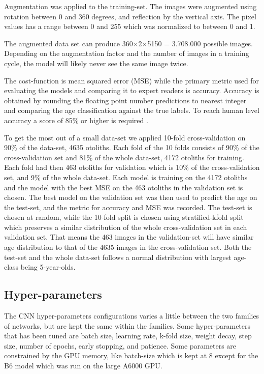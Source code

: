 \documentclass[10pt,letterpaper]{article}
\begin{document}
Augmentation was applied to the training-set. The images were augmented using rotation between 0 and 360 degrees, and reflection by the vertical axis. The pixel values has a range between 0 and 255 which was normalized to between 0 and 1.

The augmented data set can produce 360$\times$2$\times$5150 = 3.708.000 possible images.
Depending on the augmentation factor and the number of images in a training cycle, the model will likely never see the same image twice.

The cost-function is mean squared error (MSE)
while the primary metric used for evaluating the models and comparing it to expert readers is accuracy. Accuracy is obtained by rounding the floating point number predictions to nearest integer and comparing the age classification against the true labels.
To reach human level accuracy a score of 85\% or higher is required \citep{ref_needed}.

To get the most out of a small data-set we applied 10-fold cross-validation on 90\% of the data-set, 4635 otoliths. Each fold of the 10 folds consists of 90\% of the cross-validation set and 81\% of the whole data-set, 4172 otoliths for training. Each fold had then 463 otoliths for validation which is 10\% of the cross-validation set, and 9\% of the whole data-set. Each model is training on the 4172 otoliths and the model with the best MSE on the 463 otoliths in the validation set is chosen. The best model on the validation set was then used to predict the age on the test-set, and the metric for accuracy and MSE was recorded. The test-set is chosen at random, while the 10-fold split is chosen using stratified-kfold split which preserves a similar distribution of the whole cross-validation set in each validation set. That means the 463 images in the validation-set will have similar age distribution to that of the 4635 images in the cross-validation set. Both the test-set and the whole data-set follows a normal distribution with largest age-class being 5-year-olds.

\subsection*{Hyper-parameters}

The CNN hyper-parameters configurations varies a little between the two families of networks, 
but are kept the same within the families. Some hyper-parameters
that has been tuned are batch size, learning rate, k-fold size, weight decay, step size, number of epochs, early stopping, and patience. Some parameters are constrained by the GPU memory, like batch-size which
is kept at 8 except for the B6 model which was run on the large A6000 GPU.
\end{document}
